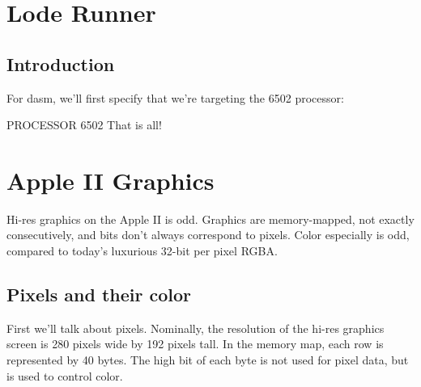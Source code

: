 \documentclass[10pt]{report}%
\begin{document}
\pagestyle{noweb}

\chapter{Lode Runner}

\section{Introduction}
For dasm, we'll first specify that we're targeting the 6502 processor:

\nwenddocs{}\endmoddef\nwstartdeflinemarkup{}\nwenddeflinemarkup
    PROCESSOR 6502
\nwendcode{}That is all!

\chapter{Apple II Graphics}
Hi-res graphics on the Apple II is odd. Graphics are memory-mapped, not exactly
consecutively, and bits don't always correspond to pixels. Color especially is
odd, compared to today's luxurious 32-bit per pixel RGBA.

\section{Pixels and their color}
First we'll talk about pixels. Nominally, the resolution of the hi-res graphics screen
is 280 pixels wide by 192 pixels tall. In the memory map, each row is represented
by 40 bytes. The high bit of each byte is not used for pixel data, but is used to
control color.
\end{document}
